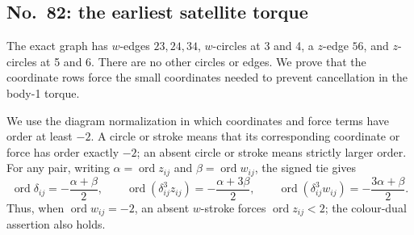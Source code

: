 \documentclass[11pt]{amsart}
\theoremstyle{remark}
\newcommand{\ord}{\operatorname{ord}}
\begin{document}
\subsection{No.~82: the earliest satellite torque}\label{sec:no82-torque}
The exact graph has $w$-edges $23,24,34$, $w$-circles at 3 and 4, a $z$-edge $56$, and $z$-circles at 5 and 6. There are no other circles or edges. We prove that the coordinate rows force the small coordinates needed to prevent cancellation in the body-1 torque.

We use the diagram normalization in which coordinates and force terms have order at least $-2$. A circle or stroke means that its corresponding coordinate or force has order exactly $-2$; an absent circle or stroke means strictly larger order. For any pair, writing $\alpha=\ord z_{ij}$ and $\beta=\ord w_{ij}$, the signed tie gives
\begin{equation}\label{eq:torque-order-identity}
\ord\delta_{ij}=-\frac{\alpha+\beta}{2},\qquad
\ord(\delta_{ij}^3z_{ij})=-\frac{\alpha+3\beta}{2},\qquad
\ord(\delta_{ij}^3w_{ij})=-\frac{3\alpha+\beta}{2}.
\end{equation}
Thus, when $\ord w_{ij}=-2$, an absent $w$-stroke forces $\ord z_{ij}<2$; the colour-dual assertion also holds.
\end{document}
